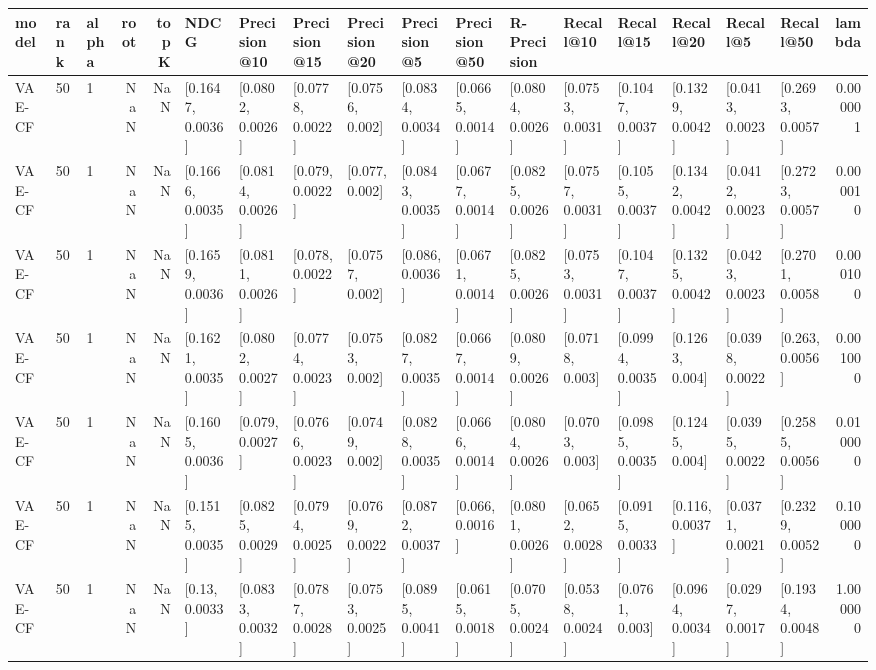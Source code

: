 \begin{tabular}{lllrrllllllllllllr}
\toprule
   model & rank & alpha &  root &  topK &              NDCG &      Precision@10 &      Precision@15 &      Precision@20 &       Precision@5 &      Precision@50 &       R-Precision &         Recall@10 &         Recall@15 &         Recall@20 &          Recall@5 &         Recall@50 &    lambda \\
\midrule
  VAE-CF &   50 &     1 &   NaN &   NaN &  [0.1647, 0.0036] &  [0.0802, 0.0026] &  [0.0778, 0.0022] &   [0.0756, 0.002] &  [0.0834, 0.0034] &  [0.0665, 0.0014] &  [0.0804, 0.0026] &  [0.0753, 0.0031] &  [0.1047, 0.0037] &  [0.1329, 0.0042] &  [0.0413, 0.0023] &  [0.2693, 0.0057] &  0.000001 \\
  VAE-CF &   50 &     1 &   NaN &   NaN &  [0.1666, 0.0035] &  [0.0814, 0.0026] &   [0.079, 0.0022] &    [0.077, 0.002] &  [0.0843, 0.0035] &  [0.0677, 0.0014] &  [0.0825, 0.0026] &  [0.0757, 0.0031] &  [0.1055, 0.0037] &  [0.1342, 0.0042] &  [0.0412, 0.0023] &  [0.2723, 0.0057] &  0.000010 \\
  VAE-CF &   50 &     1 &   NaN &   NaN &  [0.1659, 0.0036] &  [0.0811, 0.0026] &   [0.078, 0.0022] &   [0.0757, 0.002] &   [0.086, 0.0036] &  [0.0671, 0.0014] &  [0.0825, 0.0026] &  [0.0753, 0.0031] &  [0.1047, 0.0037] &  [0.1325, 0.0042] &  [0.0423, 0.0023] &  [0.2701, 0.0058] &  0.000100 \\
  VAE-CF &   50 &     1 &   NaN &   NaN &  [0.1621, 0.0035] &  [0.0802, 0.0027] &  [0.0774, 0.0023] &   [0.0753, 0.002] &  [0.0827, 0.0035] &  [0.0667, 0.0014] &  [0.0809, 0.0026] &   [0.0718, 0.003] &  [0.0994, 0.0035] &   [0.1263, 0.004] &  [0.0398, 0.0022] &   [0.263, 0.0056] &  0.001000 \\
  VAE-CF &   50 &     1 &   NaN &   NaN &  [0.1605, 0.0036] &   [0.079, 0.0027] &  [0.0766, 0.0023] &   [0.0749, 0.002] &  [0.0828, 0.0035] &  [0.0666, 0.0014] &  [0.0804, 0.0026] &   [0.0703, 0.003] &  [0.0985, 0.0035] &   [0.1245, 0.004] &  [0.0395, 0.0022] &  [0.2585, 0.0056] &  0.010000 \\
  VAE-CF &   50 &     1 &   NaN &   NaN &  [0.1515, 0.0035] &  [0.0825, 0.0029] &  [0.0794, 0.0025] &  [0.0769, 0.0022] &  [0.0872, 0.0037] &   [0.066, 0.0016] &  [0.0801, 0.0026] &  [0.0652, 0.0028] &  [0.0915, 0.0033] &   [0.116, 0.0037] &  [0.0371, 0.0021] &  [0.2329, 0.0052] &  0.100000 \\
  VAE-CF &   50 &     1 &   NaN &   NaN &    [0.13, 0.0033] &  [0.0833, 0.0032] &  [0.0787, 0.0028] &  [0.0753, 0.0025] &  [0.0895, 0.0041] &  [0.0615, 0.0018] &  [0.0705, 0.0024] &  [0.0538, 0.0024] &   [0.0761, 0.003] &  [0.0964, 0.0034] &  [0.0297, 0.0017] &  [0.1934, 0.0048] &  1.000000 \\

\end{tabular}
